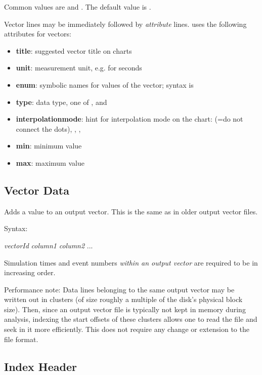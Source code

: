 Common values are  and . The default value is .

Vector lines may be immediately followed by \textit{attribute} lines.
{\opp} uses the following attributes for vectors:

\begin{itemize}
    \item \textbf{title}: suggested vector title on charts
    \item \textbf{unit}: measurement unit, e.g.  for seconds
    \item \textbf{enum}: symbolic names for values of the vector;
          syntax is 
    \item \textbf{type}: data type, one of ,  and 
    \item \textbf{interpolationmode}: hint for interpolation mode on the
          chart:  (=do not connect the dots), ,
          , 
    \item \textbf{min}: minimum value
    \item \textbf{max}: maximum value
\end{itemize}


\subsection{Vector Data}
\label{sec:result-file-formats:opp:vector-data}

Adds a value to an output vector. This is the same as in older output
vector files.

Syntax:

\hspace{20mm} \textit{vectorId} \textit{column1} \textit{column2} ...

Simulation times and event numbers \textit{within an output vector} are
required to be in increasing order.

Performance note: Data lines belonging to the same output vector may be
written out in clusters (of size roughly a multiple of the disk's
physical block size). Then, since an output vector file is typically
not kept in memory during analysis, indexing the start offsets of these
clusters allows one to read the file and seek in it more efficiently.
This does not require any change or extension to the file format.

\subsection{Index Header}
\label{sec:result-file-formats:opp:index-header}

